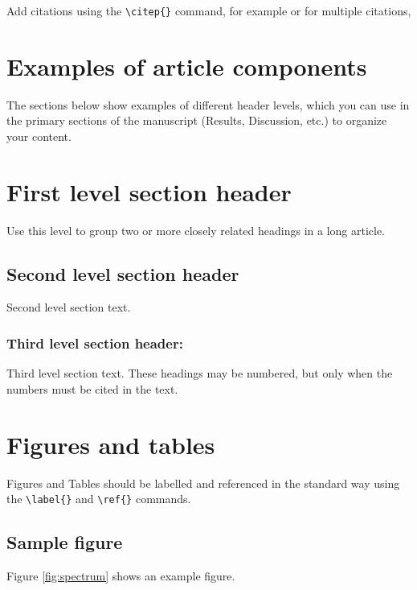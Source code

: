 \documentclass[9pt,twocolumn,twoside,lineno]{gsajnl}
\begin{document}
Add citations using the \verb|\citep{}| command, for example \citep{neher2013genealogies} or for multiple citations, \citep{neher2013genealogies, rodelsperger2014characterization,Falush16}

\section{Examples of article components}
\label{sec:examples}

The sections below show examples of different header levels, which you can use in the primary sections of the manuscript (Results, Discussion, etc.) to organize your content.

\section{First level section header}

Use this level to group two or more closely related headings in a long article.

\subsection{Second level section header}

Second level section text.

\subsubsection{Third level section header:}

Third level section text. These headings may be numbered, but only when the numbers must be cited in the text.

\section{Figures and tables}

Figures and Tables should be labelled and referenced in the standard way using the \verb|\label{}| and \verb|\ref{}| commands.

\subsection{Sample figure}

Figure \ref{fig:spectrum} shows an example figure.
\end{document}

